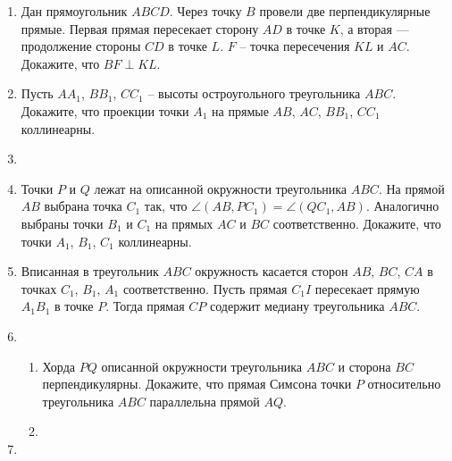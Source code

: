 \begin{enumerate}[resume*]
    \item Дан прямоугольник $ABCD$. Через точку $B$ провели две перпендикулярные прямые. Первая прямая пересекает сторону $AD$ в точке $K$, а вторая — продолжение стороны $CD$ в точке $L$. $F$ -- точка пересечения $KL$ и $AC$. Докажите, что $BF \perp KL$. \wishlisted
    \item Пусть $AA_1$, $BB_1$, $CC_1$ -- высоты остроугольного треугольника $ABC$. Докажите, что проекции точки $A_1$ на прямые $AB$, $AC$, $BB_1$, $CC_1$ коллинеарны. \wishlisted
    \item {}
    \item Точки $P$ и $Q$ лежат на описанной окружности треугольника $ABC$. На прямой $AB$ выбрана точка $C_1$ так, что $\angle(AB, PC_1) = \angle(QC_1, AB)$. Аналогично выбраны точки $B_1$ и $C_1$ на прямых $AC$ и $BC$ соответственно. Докажите, что точки $A_1$, $B_1$, $C_1$ коллинеарны.
    \item Вписанная в треугольник $ABC$ окружность касается сторон $AB$, $BC$, $CA$ в точках $C_1$, $B_1$, $A_1$ соответственно. Пусть прямая $C_1I$ пересекает прямую $A_1B_1$ в точке $P$. Тогда прямая $CP$ содержит медиану треугольника $ABC$. \wishlisted
    \item \begin{enumerate}
        \item Хорда $PQ$ описанной окружности треугольника $ABC$ и сторона $BC$ перпендикулярны. Докажите, что прямая Симсона точки $P$ относительно треугольника $ABC$ параллельна прямой $AQ$. \wishlisted
        \item {}
    \end{enumerate}
    
    \item {} \wishlisted


\end{enumerate}
